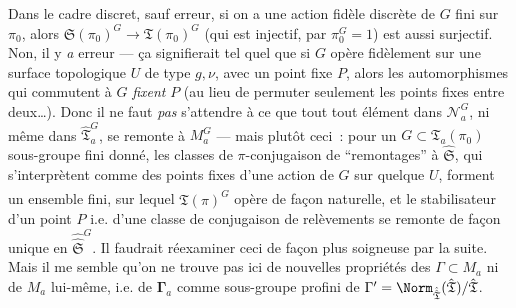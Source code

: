 Dans le cadre discret, sauf erreur, si on a une action fidèle discrète de $G$ fini sur $\pi_0$, alors $\mathfrak{S}(\pi_0)^G\to\mathfrak{T}(\pi_0)^G$ (qui est injectif, par $\pi_0^G=1$) est aussi surjectif. Non, il y \emph{a} erreur --- \c{c}a signifierait tel quel que si $G$ opère fidèlement sur une surface topologique $U$ de type $g,\nu$, avec un point fixe $P$, alors les automorphismes qui commutent à $G$ \emph{fixent} $P$ (au lieu de permuter seulement les points fixes entre deux\dots). Donc il ne faut {\it pas} s'attendre à ce que tout tout élément  dans $\mathcal{N}_a^G$, ni même dans $\hat{\mathfrak{T}}_a^G$, se remonte à $M_a^G$ --- mais plutôt ceci~: pour un $G\subset \mathfrak{T}_a(\pi_0)$ sous-groupe fini donné, les classes de $\pi$-conjugaison de ``remontages'' à $\hat{\mathfrak{S}}$, qui s'interprètent comme des points fixes d'une action de $G$ sur quelque $U$, forment un ensemble fini, sur lequel $\hat{\hat{\mathfrak{T}}}(\pi)^G$ opère de fa\c{c}on naturelle, et le stabilisateur d'un point $P$ i.e. d'une classe de conjugaison de relèvements se remonte de fa\c{c}on unique en $\hat{\hat{\mathfrak{S}}}^G$. Il faudrait réexaminer ceci de fa\c{c}on plus soigneuse par la suite. Mais il me semble qu'on ne trouve pas ici de nouvelles propriétés des $\Gamma\subset M_a$ ni de $M_a$ lui-même, i.e. de $\boldsymbol{\Gamma}_a$ comme sous-groupe profini de $\Gamma'= \Norm_{\hat{\hat{\mathfrak{T}}}} (\hat{\mathfrak{T}})/\hat{\mathfrak{T}}$.


